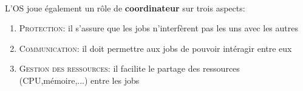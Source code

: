 {\paragraph{}
L'OS joue également un rôle de \textbf{coordinateur} sur trois aspects:
\begin{enumerate}
\item \textcolor{ltred}{\textsc{Protection}}: il s'assure que les jobs n'interfèrent pas les uns avec les autres
\item \textcolor{ltred}{\textsc{Communication}}: il doit permettre aux jobs de pouvoir intéragir entre eux
\item \textcolor{ltred}{\textsc{Gestion des ressources}}: il facilite le partage des ressources (CPU,mémoire,...) entre les jobs
\end{enumerate}
}


